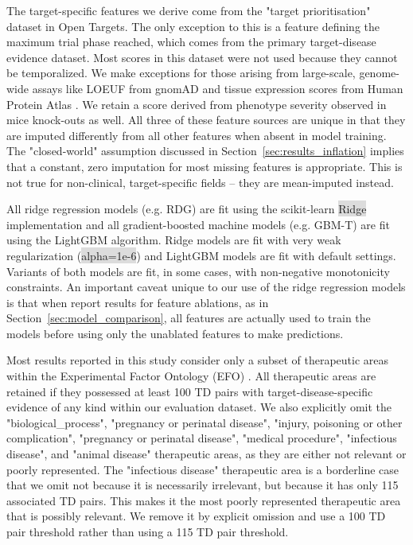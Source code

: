 \documentclass{article}
\begin{document}
The target-specific features we derive come from the "target prioritisation" dataset \cite{OTtargetPrioritisation} in Open Targets. The only exception to this is a feature defining the maximum trial phase reached, which comes from the primary target-disease evidence dataset. Most scores in this dataset were not used because they cannot be temporalized. We make exceptions for those arising from large-scale, genome-wide assays like LOEUF from gnomAD \cite{PMID:32461654} and tissue expression scores from Human Protein Atlas \cite{PMID:25613900}. We retain a score derived from phenotype severity observed in mice knock-outs \cite{PMID:33231642} as well. All three of these feature sources are unique in that they are imputed differently from all other features when absent in model training. The "closed-world" assumption discussed in Section~\ref{sec:results_inflation} implies that a constant, zero imputation for most missing features is appropriate. This is not true for non-clinical, target-specific fields -- they are mean-imputed instead.

All ridge regression models (e.g. RDG) are fit using the scikit-learn \colorbox{Gainsboro}{Ridge} implementation and all gradient-boosted machine models (e.g. GBM-T) are fit using the LightGBM \cite{LightGBM} algorithm. Ridge models are fit with very weak regularization (\colorbox{Gainsboro}{alpha=1e-6}) and LightGBM models are fit with default settings. Variants of both models are fit, in some cases, with non-negative monotonicity constraints. An important caveat unique to our use of the ridge regression models is that when report results for feature ablations, as in Section~\ref{sec:model_comparison}, all features are actually used to train the models before using only the unablated features to make predictions.

Most results reported in this study consider only a subset of therapeutic areas within the Experimental Factor Ontology (EFO) \cite{PMID:20200009}. All therapeutic areas are retained if they possessed at least 100 TD pairs with target-disease-specific evidence of any kind within our evaluation dataset. We also explicitly omit the "biological\_process", "pregnancy or perinatal disease", "injury, poisoning or other complication", "pregnancy or perinatal disease", "medical procedure", "infectious disease", and "animal disease" therapeutic areas, as they are either not relevant or poorly represented. The "infectious disease" therapeutic area is a borderline case that we omit not because it is necessarily irrelevant, but because it has only 115 associated TD pairs. This makes it the most poorly represented therapeutic area that is possibly relevant. We remove it by explicit omission and use a 100 TD pair threshold rather than using a 115 TD pair threshold.
\end{document}
